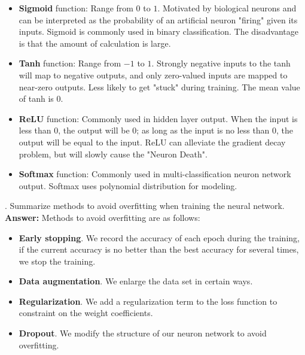 \documentclass{article}
\begin{document}
\begin{itemize}
    \item \textbf{Sigmoid} function: Range from $0$ to $1$. Motivated by biological neurons and can be interpreted as the probability of an artificial neuron "firing" given its inputs. Sigmoid is commonly used in binary classification. The disadvantage is that the amount of calculation is large.
    
    \item \textbf{Tanh} function: Range from $-1$ to $1$. Strongly negative inputs to the tanh will map to negative outputs, and only zero-valued inputs are mapped to near-zero outputs. Less likely to get "stuck" during training. The mean value of tanh is $0$.
    
    \item \textbf{ReLU} function: Commonly used in hidden layer output. When the input is less than $0$, the output will be $0$; as long as the input is no less than $0$, the output will be equal to the input. ReLU can alleviate the gradient decay problem, but will slowly cause the "Neuron Death".
    
    \item \textbf{Softmax} function: Commonly used in multi-classification neuron network output. Softmax uses polynomial distribution for modeling.
\end{itemize}


. Summarize methods to avoid overfitting when training the neural network.  \\ 

\textbf{Answer: } Methods to avoid overfitting are as follows:

\begin{itemize}
    \item \textbf{Early stopping}. We record the accuracy of each epoch during the training, if the current accuracy is no better than the best accuracy for several times, we stop the training.
    
    \item \textbf{Data augmentation}. We enlarge the data set in certain ways.
    
    \item \textbf{Regularization}. We add a regularization term to the loss function to constraint on the weight coefficients.
    
    \item \textbf{Dropout}. We modify the structure of our neuron network to avoid overfitting.
    
\end{itemize}
\end{document}
